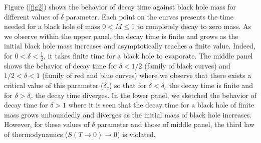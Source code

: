 \documentclass[twocolumn,preprintnumbers,amsmath,nofootinbib,amssymb]{revtex4}
\begin{document}
Figure (\ref{fig2}) shows the behavior of decay time against black
hole mass for different values of $\delta$ parameter. Each point
on the curves presents the time needed for a black hole of mass
$0<M\leq1$ to completely decay to zero mass. As we observe within
the upper panel, the decay time is finite and grows as the initial
black hole mass increases and asymptotically reaches a finite
value. Indeed, for $0<\delta<\frac{1}{2}$, it takes finite time
for a black hole to evaporate. The middle panel shows the behavior
of decay time for $\delta<1/2$ (family of black curves) and
$1/2<\delta<1$ (family of red and blue curves) where we observe
that there exists a critical value of this parameter
($\delta_{c}$) so that for $\delta<\delta_c$ the decay time is
finite and for $\delta>\delta_c$ the decay time diverges. In the
lower panel, we sketched the behavior of decay time for $\delta>1$
where it is seen that the decay time for a black hole of finite
mass grows unboundedly and diverges as the initial mass of black
hole increases. However, for these values of $\delta$ parameter
and those of middle panel, the third law of thermodynamics
($S(T\rightarrow0)\rightarrow 0$) is violated.
\end{document}
